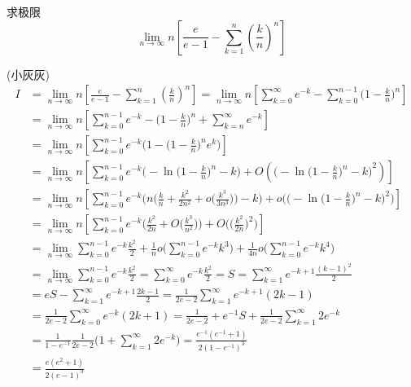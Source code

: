 \documentclass[color=green,titlestyle=hang]{elegantbook}%
\begin{document}
\begin{exercise}求极限\begin{equation*}\lim_{n\to\infty}n\left[\frac{e}{e - 1}-\sum_{k = 1}^n\left(\frac{k}{n}\right)^n\right]\end{equation*}\end{exercise}
\begin{Solution}(小灰灰)
\begin{align*}I&=\lim_{n\to\infty}n\left[\frac{e}{e - 1}-\sum_{k = 1}^n\left(\frac{k}{n}\right)^n\right]=\lim_{n\to\infty}n\left[\sum_{k=0}^{\infty}{e}^{-k}-\sum_{k=0}^{n-1}\Big(1-\frac{k}{n}\Big)^{n}\right]\\
&=\lim_{n\to \infty}n\left[\sum_{k=0}^{n-1}{e}^{-k}-\Big(1-\frac{k}{n}\Big)^{n}+\sum_{k=n}^{\infty}{e}^{-k}\right]\\
&=\lim\limits_{n\to\infty}n\left[\sum_{k=0}^{n-1}{e}^{-k}\biggl(1-\Big(1-\frac{k}{n}\Big)^{n}{e}^{k}\biggl)\right]\\
&=\lim\limits_{n\to \infty}n\left[\sum_{k=0}^{n-1}{e}^{-k}\bigg(-\ln\Big(1-\frac{k}{n}\Big)^{n}-k\bigg)+O\left({\bigg(-\ln\Big(1-\frac{k}{n}\Big)^{n}-k\bigg)}^{2}\right)\right]\\
&=\lim_{n\to \infty}n\left[\sum_{k=0}^{n-1}{e}^{-k}\biggl(n\bigg(\frac{k}{n}+\frac{{k}^{2}}{2{n}^{2}}+o\Big(\frac{{k}^{3}}{3{n}^{3}}\Big)\bigg)-k\biggl)+o\biggl(\bigg(-\ln\Big(1-\frac{k}{n}\Big)^{n}-k\bigg)^{2}\biggl)\right]\\
&=\lim_{n\to\infty}n\left[\sum_{k=0}^{n-1}{e}^{-k}\bigg(\frac{{k}^{2}}{2n}+O\Big(\frac{k^3}{n^2}\Big)\bigg)+O\bigg(\Big(\frac{k^2}{2n}\Big)^{2}\bigg)\right]\\
&=\lim\limits_{n\to \infty}\sum_{k=0}^{n-1}{e}^{-k}\frac{{k}^{2}}{2}+\frac{1}{n}o\bigg(\sum_{k=0}^{n-1}{e}^{-k}{k}^{3}\bigg)+\frac{1}{4n}o\bigg(\sum_{k=0}^{n-1}{e}^{-k}{k}^{4}\bigg)\\
&=\lim\limits_{n\to \infty}\sum_{k=0}^{n-1}{e}^{-k}\frac{{k}^{2}}{2}=\sum_{k=0}^{\infty}{e}^{-k}\frac{{k}^{2}}{2} 
=S=\sum_{k=1}^{\infty}{e}^{-k+1}\frac{{(k-1)}^{2}}{2}\\
&=eS-\sum_{k=1}^{\infty}{e}^{-k+1}\frac{2k-1}{2} 
=\frac{1}{2e-2}\sum_{k=1}^{\infty}{e}^{-k+1}(2k-1) \\
&=\frac{1}{2e-2}\sum_{k=0}^{\infty}{e}^{-k}(2k+1)=\frac{1}{2e-2}+{e}^{-1}S+\frac{1}{2e-2}\sum_{k=1}^{\infty}2{e}^{-k}\\
&=\frac{1}{1-{e}^{-1}}\frac{1}{2e-2}\bigg(1+\sum_{k=1}^{\infty}2{e}^{-k}\bigg) 
=\frac{{e}^{-1}({e}^{-1}+1)}{2{(1-{e}^{-1})}^{3}}\\
&=\frac{e(e^2+1)}{2(e-1)^{3}}
\end{align*}
\end{Solution}
\end{document}

